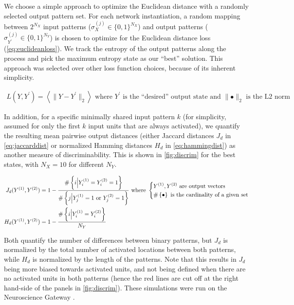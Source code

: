 We choose a simple approach to optimize the Euclidean distance with a randomly selected output pattern set.
For each network instantiation,
    a random mapping between $2^{N_X}$ input patterns ($\sigma_X^{(j)} \in \{0,1\}^{N_X}$)
        and output patterns ($\sigma_{Y^\prime}^{(j)} \in \{0,1\}^{N_Y}$)
    is chosen to optimize for the Euclidean distance loss (\autoref{eq:euclideanloss}).
We track the entropy of the output patterns along the process
    and pick the maximum entropy state as our ``best'' solution.
    This approach was selected over other loss function choices, because of its inherent simplicity.

\vspace{-1em}
\begin{align}
    L(Y, Y^{\prime}) = \left \langle \lVert Y - Y^{\prime} \rVert_2 \right \rangle
    \text{ where } Y^{\prime} \text{ is the ``desired'' output state}
    \text{ and } \lVert \bullet \rVert_2 \text{ is the L2 norm}
    \label{eq:euclideanloss}
\end{align}

In addition, for a specific minimally shared input pattern $k$
        (for simplicity, assumed for only the first $k$ input units that are always activated),
        we quantify the resulting mean pairwise output distances
        (either Jaccard distances $J_d$ in \autoref{eq:jaccarddist}
        or normalized Hamming distances $H_d$ in \autoref{eq:hammingdist})
        as another measure of discriminability.
    This is shown in \autoref{fig:discrim} for the best states,
        with $N_X=10$ for different $N_Y$.

\vspace{-1em}
\begin{align}
    J_d(Y^{(1)}, Y^{(2)}) &= 1 -
        \frac{
            \# \left\{
                i \Big| Y^{(1)}_i = Y^{(2)}_i = 1
                \right\}
        }{
            \# \left\{
                j \Big| Y^{(1)}_j = 1 \text{ or } Y^{(2)}_j = 1
                \right\}
        }
        \text{ where }
        \begin{dcases}
            Y^{(1)}, Y^{(2)} \text{ are output vectors}
            \\
            \# \left\{\bullet\right\}
            \text{ is the cardinality of a given set}
        \end{dcases}
    \label{eq:jaccarddist}
    \\
    H_d(Y^{(1)}, Y^{(2)}) &= 1 -
        \frac{
            \# \left\{
                i \Big| Y^{(1)}_i = Y^{(2)}_i
                \right\}
        }{
            N_Y
        }
    \label{eq:hammingdist}
\end{align}


Both quantify the number of differences between binary patterns,
        but $J_d$ is normalized by the total number of activated locations between both patterns,
        while $H_d$ is normalized by the length of the patterns.
    Note that this results in $J_d$ being more biased towards activated units,
        and not being defined when there are no activated units in both patterns
        (hence the red lines are cut off at the right hand-side of the panels in \autoref{fig:discrim}).
    These simulations were run on the Neuroscience Gateway \citep{Sivagnanam2013-au}.

